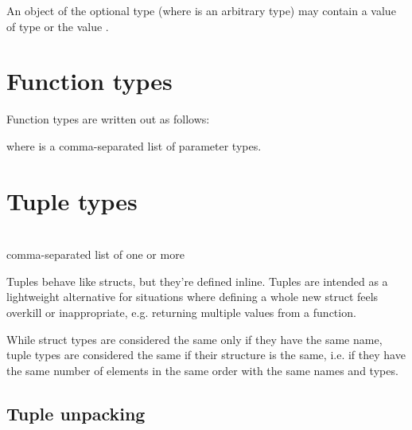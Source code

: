 An object of the optional type  (where  is an arbitrary type)
may contain a value of type  or the value .

\begin{grammar}
 \textrightarrow{}  
\end{grammar}

\section{Function types}

Function types are written out as follows:

\begin{grammar}
 \textrightarrow{} \code{(}  \code{)} \code{->} 
\end{grammar}

where  is a comma-separated list of parameter
types.

\section{Tuple types}

\begin{grammar}
 \textrightarrow{} \code{(}  \code{)}\\
 \textrightarrow{} comma-separated list of one or more \\
 \textrightarrow{}  \code{:} 
\end{grammar}

Tuples behave like structs, but they're defined inline. Tuples are intended as
a lightweight alternative for situations where defining a whole new struct feels
overkill or inappropriate, e.g. returning multiple values from a function.

While struct types are considered the same only if they have the same name,
tuple types are considered the same if their structure is the same, i.e. if they
have the same number of elements in the same order with the same names and
types.

\subsection{Tuple unpacking}

